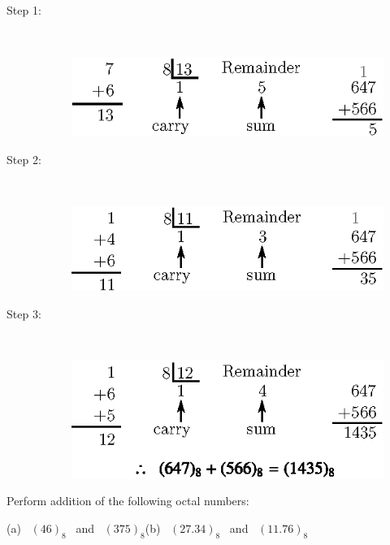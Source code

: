 \begin{description}
\item[Step 1:] 
~
\begin{figure}[H]
\centering
\includegraphics{chap6/fig25.eps}
\end{figure}

\item[Step 2:] 
~
\begin{figure}[H]
\centering
\includegraphics{chap6/fig26.eps}
\end{figure}

\item[Step 3:] 
~
\begin{figure}[H]
\centering
\includegraphics{chap6/fig27.eps}
\end{figure}
\end{description}

\begin{example}\label{exam6.13}
Perform addition of the following octal numbers:
\begin{center}
(a)~ $(46)_{8}$ \ and \ $(375)_{8}$\qquad (b)~ $(27.34)_{8}$ \ and \ $(11.76)_{8}$
\end{center}
\end{example}

